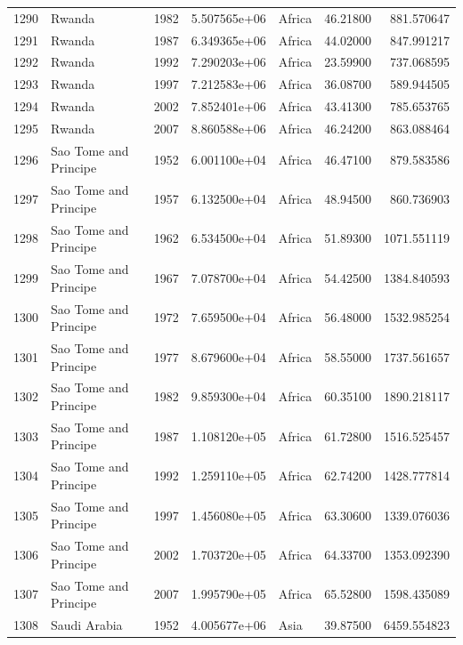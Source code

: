\documentclass[
  letterpaper,
  DIV=11,
  numbers=noendperiod]{scrreprt}
\begin{document}
\begin{tabular}{llrrlrr}
1290 &                    Rwanda &  1982 &  5.507565e+06 &    Africa &  46.21800 &     881.570647 \\
1291 &                    Rwanda &  1987 &  6.349365e+06 &    Africa &  44.02000 &     847.991217 \\
1292 &                    Rwanda &  1992 &  7.290203e+06 &    Africa &  23.59900 &     737.068595 \\
1293 &                    Rwanda &  1997 &  7.212583e+06 &    Africa &  36.08700 &     589.944505 \\
1294 &                    Rwanda &  2002 &  7.852401e+06 &    Africa &  43.41300 &     785.653765 \\
1295 &                    Rwanda &  2007 &  8.860588e+06 &    Africa &  46.24200 &     863.088464 \\
1296 &     Sao Tome and Principe &  1952 &  6.001100e+04 &    Africa &  46.47100 &     879.583586 \\
1297 &     Sao Tome and Principe &  1957 &  6.132500e+04 &    Africa &  48.94500 &     860.736903 \\
1298 &     Sao Tome and Principe &  1962 &  6.534500e+04 &    Africa &  51.89300 &    1071.551119 \\
1299 &     Sao Tome and Principe &  1967 &  7.078700e+04 &    Africa &  54.42500 &    1384.840593 \\
1300 &     Sao Tome and Principe &  1972 &  7.659500e+04 &    Africa &  56.48000 &    1532.985254 \\
1301 &     Sao Tome and Principe &  1977 &  8.679600e+04 &    Africa &  58.55000 &    1737.561657 \\
1302 &     Sao Tome and Principe &  1982 &  9.859300e+04 &    Africa &  60.35100 &    1890.218117 \\
1303 &     Sao Tome and Principe &  1987 &  1.108120e+05 &    Africa &  61.72800 &    1516.525457 \\
1304 &     Sao Tome and Principe &  1992 &  1.259110e+05 &    Africa &  62.74200 &    1428.777814 \\
1305 &     Sao Tome and Principe &  1997 &  1.456080e+05 &    Africa &  63.30600 &    1339.076036 \\
1306 &     Sao Tome and Principe &  2002 &  1.703720e+05 &    Africa &  64.33700 &    1353.092390 \\
1307 &     Sao Tome and Principe &  2007 &  1.995790e+05 &    Africa &  65.52800 &    1598.435089 \\
1308 &              Saudi Arabia &  1952 &  4.005677e+06 &      Asia &  39.87500 &    6459.554823 \\

\end{tabular}
\end{document}
